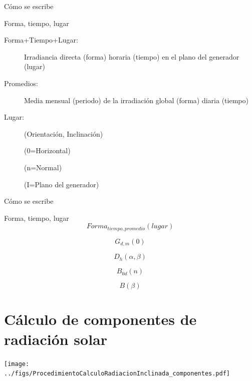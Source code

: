 \documentclass[xcolor={usenames,svgnames,dvipsnames}]{beamer}
\begin{document}
\begin{frame}[label={sec:org5c1b7ef}]{Cómo se escribe}
\begin{block}{Forma, tiempo, lugar}
\begin{description}
\item[{Forma+Tiempo+Lugar:}] Irradiancia directa (forma) horaria (tiempo)
en el plano del generador (lugar)

\item[{Promedios:}] Media mensual (periodo) de la irradiación global
(forma) diaria (tiempo)

\item[{Lugar:}] (Orientación, Inclinación)

(0=Horizontal)

(n=Normal)

(I=Plano del generador)
\end{description}
\end{block}
\end{frame}

\begin{frame}[label={sec:org776274e}]{Cómo se escribe}
\begin{block}{Forma, tiempo, lugar}
\[Forma_{tiempo,promedio}(lugar)\]

\[G_{d,m}(0)\]

\[D_{h}(\alpha,\beta)\]

\[B_{0d}(n)\]

\[B(\beta)\]
\end{block}
\end{frame}
\section{Cálculo de componentes de radiación solar}
\label{sec:org9d26617}

\begin{frame}[label={sec:orgfe764ff}]{}
\begin{center}
\texttt{[image: ../figs/ProcedimientoCalculoRadiacionInclinada\_componentes.pdf]}
\end{center}
\end{frame}
\end{document}
